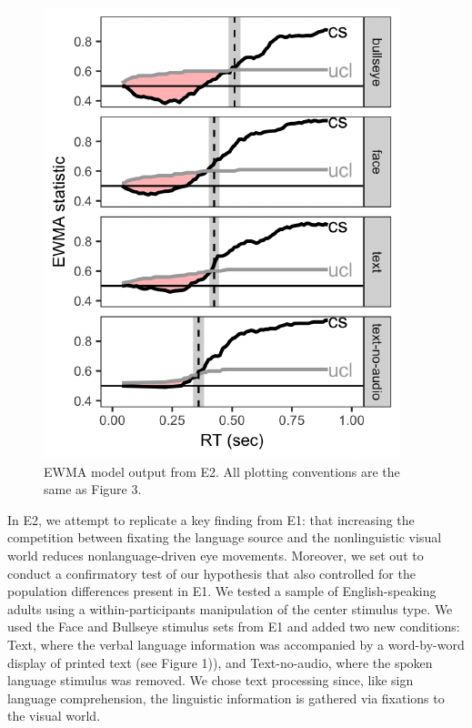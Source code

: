 \documentclass[10pt, letterpaper]{article}
\newenvironment{CodeChunk}{}{}
\begin{document}
\begin{CodeChunk}
\begin{figure}[t]

{\centering \includegraphics{figs/e2_control_chart-1} 

}

\caption[EWMA model output from E2]{EWMA model output from E2. All plotting conventions are the same as Figure 3.}\label{fig:e2_control_chart}
\end{figure}
\end{CodeChunk}

In E2, we attempt to replicate a key finding from E1: that increasing
the competition between fixating the language source and the
nonlinguistic visual world reduces nonlanguage-driven eye movements.
Moreover, we set out to conduct a confirmatory test of our hypothesis
that also controlled for the population differences present in E1. We
tested a sample of English-speaking adults using a within-participants
manipulation of the center stimulus type. We used the Face and Bullseye
stimulus sets from E1 and added two new conditions: Text, where the
verbal language information was accompanied by a word-by-word display of
printed text (see Figure 1)), and Text-no-audio, where the spoken
language stimulus was removed. We chose text processing since, like sign
language comprehension, the linguistic information is gathered via
fixations to the visual world.
\end{document}
